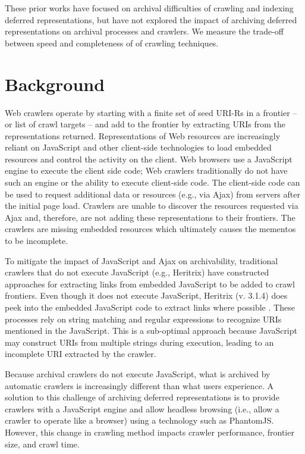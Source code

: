 \documentclass{ipres_proc_article-sp}
\begin{document}
These prior works have focused on archival difficulties of crawling and indexing deferred representations, but have not explored the impact of archiving deferred representations on archival processes and crawlers. We measure the trade-off between speed and completeness of of crawling techniques.

\section{Background}
\label{backgroung}
Web crawlers operate by starting with a finite set of seed URI-Rs in a frontier -- or list of crawl targets -- and add to the frontier by extracting URIs from the representations returned. 
Representations of Web resources are increasingly reliant on JavaScript and other client-side technologies to load embedded resources and control the activity on the client. Web browsers use a JavaScript engine to execute the client side code; Web crawlers traditionally do not have such an engine or the ability to execute client-side code. The client-side code can be used to request additional data or resources (e.g., via Ajax) from servers after the initial page load. Crawlers are unable to discover the resources requested via Ajax and, therefore, are not adding these representations to their frontiers. The crawlers are missing embedded resources which ultimately causes the mementos to be incomplete. 

To mitigate the impact of JavaScript and Ajax on archivability, traditional crawlers that do not execute JavaScript (e.g., Heritrix) have constructed approaches for extracting links from embedded JavaScript to be added to crawl frontiers. Even though it does not execute JavaScript, Heritrix (v. 3.1.4) does peek into the embedded JavaScript code to extract links where possible \cite{htrixJS}. These processes rely on string matching and regular expressions to recognize URIs mentioned in the JavaScript. This is a sub-optimal approach because JavaScript may construct URIs from multiple strings during execution, leading to an incomplete URI extracted by the crawler.  

Because archival crawlers do not execute JavaScript, what is archived by automatic crawlers is increasingly different than what users experience. A solution to this challenge of archiving deferred representations is to provide crawlers with a JavaScript engine and allow headless browsing (i.e., allow a crawler to operate like a browser) using a technology such as PhantomJS. However, this change in crawling method impacts crawler performance, frontier size, and crawl time.
\end{document}
